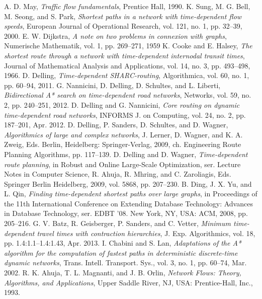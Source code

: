 \documentclass[conference]{IEEEtran}
\begin{document}
\begin{thebibliography}{99}
 A. D. May, {\it Traffic flow fundamentals}, Prentice Hall, 1990.
 K. Sung, M. G. Bell, M. Seong, and S. Park, {\it Shortest paths in a network with time-dependent flow speeds}, European Journal of Operational Research, vol. 121, no. 1, pp. 32–39, 2000.
 E. W. Dijkstra, {\it A note on two problems in connexion with graphs}, Numerische Mathematik, vol. 1, pp. 269–271, 1959
 K. Cooke and E. Halsey, {\it The shortest route through a network with time-dependent internodal transit times}, Journal of Mathematical Analysis and Applications, vol. 14, no. 3, pp. 493–498, 1966.
 D. Delling, {\it Time-dependent SHARC-routing}, Algorithmica, vol. 60, no. 1, pp. 60–94, 2011.
 G. Nannicini, D. Delling, D. Schultes, and L. Liberti, {\it Bidirectional A* search on time-dependent road networks}, Networks, vol. 59, no. 2, pp. 240–251, 2012.
 D. Delling and G. Nannicini, {\it Core routing on dynamic time-dependent road networks}, INFORMS J. on Computing, vol. 24, no. 2, pp. 187–201, Apr. 2012.
 D. Delling, P. Sanders, D. Schultes, and D. Wagner, {\it Algorithmics of large and complex networks}, J. Lerner, D. Wagner, and K. A. Zweig, Eds. Berlin,
Heidelberg: Springer-Verlag, 2009, ch. Engineering Route Planning Algorithms, pp. 117–139.
 D. Delling and D. Wagner, {\it Time-dependent route planning}, in Robust and Online Large-Scale Optimization, ser. Lecture Notes in Computer Science, R. Ahuja, R. Mhring, and C. Zaroliagis, Eds. Springer Berlin Heidelberg, 2009, vol. 5868, pp. 207–230.
 B. Ding, J. X. Yu, and L. Qin, {\it Finding time-dependent shortest paths over large graphs}, in Proceedings of the 11th International Conference on Extending Database Technology: Advances in Database Technology, ser. EDBT ’08. New York, NY, USA: ACM, 2008, pp. 205–216.
 G. V. Batz, R. Geisberger, P. Sanders, and C. Vetter, {\it Minimum time-dependent travel times with contraction hierarchies}, J. Exp. Algorithmics, vol. 18, pp. 1.4:1.1–1.4:1.43, Apr. 2013.
 I. Chabini and S. Lan, {\it Adaptations of the A* algorithm for the computation of fastest paths in deterministic discrete-time dynamic networks}, Trans. Intell. Transport. Sys., vol. 3, no. 1, pp. 60–74, Mar. 2002.
 R. K. Ahuja, T. L. Magnanti, and J. B. Orlin, {\it Network Flows: Theory, Algorithms, and Applications}, Upper Saddle River, NJ, USA: Prentice-Hall, Inc., 1993.

\end{thebibliography}
\end{document}
